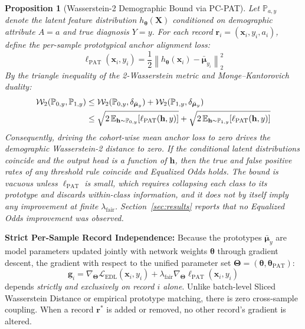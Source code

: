 \documentclass[3p,12pt]{elsarticle}
\theoremstyle{plain}
\newtheorem{proposition}[theorem]{Proposition}
\theoremstyle{definition}
\begin{document}
\begin{proposition}[Wasserstein-2 Demographic Bound via PC-PAT]
\label{prop:wasserstein_bound}
Let $\mathbb{P}_{a, y}$ denote the latent feature distribution $h_{\boldsymbol{\theta}}(\mathbf{X})$ conditioned on demographic attribute $A=a$ and true diagnosis $Y=y$. For each record $\mathbf{r}_i = (\mathbf{x}_i, y_i, a_i)$, define the per-sample prototypical anchor alignment loss:
\begin{equation}
    \ell_{\text{PAT}}(\mathbf{x}_i, y_i) = \frac{1}{2} \left\| h_{\boldsymbol{\theta}}(\mathbf{x}_i) - \bar{\boldsymbol{\mu}}_{y_i} \right\|_2^2
\end{equation}
By the triangle inequality of the 2-Wasserstein metric and Monge--Kantorovich duality:
\begin{align}
    \mathcal{W}_2(\mathbb{P}_{0, y}, \mathbb{P}_{1, y}) &\le \mathcal{W}_2(\mathbb{P}_{0, y}, \delta_{\bar{\boldsymbol{\mu}}_y}) + \mathcal{W}_2(\mathbb{P}_{1, y}, \delta_{\bar{\boldsymbol{\mu}}_y}) \notag \\
    &\le \sqrt{2 \, \mathbb{E}_{\mathbf{h} \sim \mathbb{P}_{0, y}} [\ell_{\text{PAT}}(\mathbf{h}, y)]} + \sqrt{2 \, \mathbb{E}_{\mathbf{h} \sim \mathbb{P}_{1, y}} [\ell_{\text{PAT}}(\mathbf{h}, y)]}
\end{align}
Consequently, driving the cohort-wise mean anchor loss to zero drives the demographic Wasserstein-2 distance to zero. If the conditional latent distributions coincide and the output head is a function of $\mathbf{h}$, then the true and false positive rates of any threshold rule coincide and Equalized Odds holds. The bound is vacuous unless $\ell_{\text{PAT}}$ is small, which requires collapsing each class to its prototype and discards within-class information, and it does not by itself imply any improvement at finite $\lambda_{\text{fair}}$. Section~\ref{sec:results} reports that no Equalized Odds improvement was observed.
\end{proposition}

\noindent \textbf{Strict Per-Sample Record Independence:} Because the prototypes $\bar{\boldsymbol{\mu}}_y$ are model parameters updated jointly with network weights $\boldsymbol{\theta}$ through gradient descent, the gradient with respect to the unified parameter set $\boldsymbol{\Theta} = (\boldsymbol{\theta}, \boldsymbol{\theta}_{\text{PAT}})$:
\begin{equation}
    \mathbf{g}_i = \nabla_{\boldsymbol{\Theta}} \mathcal{L}_{\text{EDL}}(\mathbf{x}_i, y_i) + \lambda_{\text{fair}} \nabla_{\boldsymbol{\Theta}} \ell_{\text{PAT}}(\mathbf{x}_i, y_i)
\end{equation}
depends \emph{strictly and exclusively on record $i$ alone}. Unlike batch-level Sliced Wasserstein Distance or empirical prototype matching, there is zero cross-sample coupling. When a record $\mathbf{r}^*$ is added or removed, no other record's gradient is altered.
\end{document}
